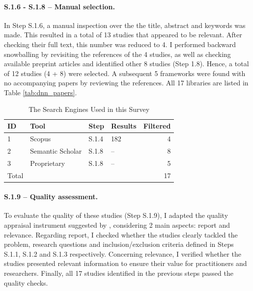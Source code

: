\paragraph{S.1.6 - S.1.8 -- Manual selection.}
In Step S.1.6, a manual inspection over the the title, abstract and keywords was made. This
resulted in a total of 13 studies that appeared to be relevant. After checking their full text,
this number was reduced to 4. I performed backward snowballing \cite{jalali_systematic_2012} by
revisiting the references of the 4 studies, as well as checking available preprint articles and
identified other 8 studies (Step 1.8). Hence, a total of 12 studies (4 + 8) were selected. A
subsequent 5 frameworks were found with no accompanying papers by reviewing the references. All 17
libraries are listed in Table \ref{tab:dnn_papers}.

\begin{table}[h!]
	\centering
	\caption{The Search Engines Used in this Survey}
	\label{tab:databases}
	\begin{tabular}{llllr}
		\hline
		ID    & Tool             & Step  & Results & Filtered \\
		\hline
		1     & Scopus           & S.1.4 & 182     & 4        \\
		2     & Semantic Scholar & S.1.8 & --      & 8        \\
		3     & Proprietary      & S.1.8 & --      & 5        \\
		\hline
		Total &                  &       &         & 17       \\
	\end{tabular}
\end{table}

\paragraph{S.1.9 -- Quality assessment.}
To evaluate the quality of these studies (Step S.1.9), I adapted the quality appraisal instrument
suggested by \cite{zhou_map_2016}, considering 2 main aspects: report and relevance. Regarding
report, I checked whether the studies clearly tackled the problem, research questions and
inclusion/exclusion criteria defined in Steps S.1.1, S.1.2 and S.1.3 respectively. Concerning
relevance, I verified whether the studies presented relevant information to ensure their value for
practitioners and researchers. Finally, all 17 studies identified in the previous steps passed the
quality checks.

